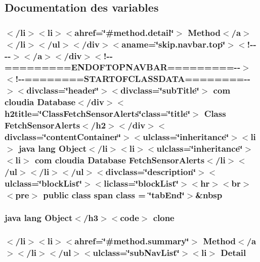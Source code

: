 \subsection{Documentation des variables}
\hypertarget{_database_2_fetch_sensor_alerts_8html_a8f97bcccbd2d05fee5fac18451ea9780}{
\subsubsection[{class}]{\setlength{\rightskip}{0pt plus 5cm}$<$/li$>$$<$li$>$$<$ahref=\char`\"{}\#method.\-detail\char`\"{}$>$ Method$<$/{\bf a}$>$$<$/li$>$$<$/ul$>$$<$/div$>$$<$aname=\char`\"{}skip.\-navbar.\-top\char`\"{}$>$$<$!-\/-\/-\/-\/$>$$<$/a$>$$<$/div$>$$<$!-\/-\/=========E\-N\-D\-O\-F\-T\-O\-P\-N\-A\-V\-B\-A\-R=========-\/-\/$>$$<$!-\/-\/========S\-T\-A\-R\-T\-O\-F\-C\-L\-A\-S\-S\-D\-A\-T\-A========-\/-\/$>$$<$divclass=\char`\"{}header\char`\"{}$>$$<$divclass=\char`\"{}sub\-Title\char`\"{}$>$ com cloudia Database$<$/div$>$$<$h2title=\char`\"{}Class\-Fetch\-Sensor\-Alerts\char`\"{}class=\char`\"{}title\char`\"{}$>$ Class {\bf Fetch\-Sensor\-Alerts}$<$/h2$>$$<$/div$>$$<$divclass=\char`\"{}content\-Container\char`\"{}$>$$<$ulclass=\char`\"{}inheritance\char`\"{}$>$$<$li$>$ java lang Object$<$/li$>$$<$li$>$$<$ulclass=\char`\"{}inheritance\char`\"{}$>$$<$li$>$ com cloudia Database {\bf Fetch\-Sensor\-Alerts}$<$/li$>$$<$/ul$>$$<$/li$>$$<$/ul$>$$<$divclass=\char`\"{}description\char`\"{}$>$$<$ulclass=\char`\"{}block\-List\char`\"{}$>$$<$liclass=\char`\"{}block\-List\char`\"{}$>$$<$hr$>$$<$br$>$$<$pre$>$ public class {\bf span} class = \char`\"{}tab\-End\char`\"{}$>$\&nbsp}}\label{_database_2_fetch_sensor_alerts_8html_a8f97bcccbd2d05fee5fac18451ea9780}
\hypertarget{_database_2_fetch_sensor_alerts_8html_adc9607fcabf6f2d7f401ad52015ef6e0}{
\subsubsection[{clone}]{\setlength{\rightskip}{0pt plus 5cm}java lang Object$<$/h3$>$$<$code$>$ clone}}\label{_database_2_fetch_sensor_alerts_8html_adc9607fcabf6f2d7f401ad52015ef6e0}
\hypertarget{_database_2_fetch_sensor_alerts_8html_a1e04b5ec07bcd5281e26dcd40e5b3a94}{
\subsubsection[{Detail}]{\setlength{\rightskip}{0pt plus 5cm}$<$/li$>$$<$li$>$$<$ahref=\char`\"{}\#method.\-summary\char`\"{}$>$ Method$<$/{\bf a}$>$$<$/li$>$$<$/ul$>$$<$ulclass=\char`\"{}sub\-Nav\-List\char`\"{}$>$$<$li$>$ Detail}}\label{_database_2_fetch_sensor_alerts_8html_a1e04b5ec07bcd5281e26dcd40e5b3a94}
